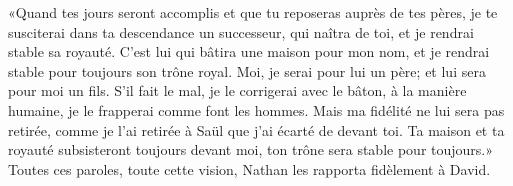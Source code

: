 «Quand tes jours seront accomplis et que tu reposeras auprès de tes pères,
	je te susciterai dans ta descendance un successeur, qui naîtra de toi,
	et je rendrai stable sa royauté.
C’est lui qui bâtira une maison pour mon nom,
	et je rendrai stable pour toujours son trône royal.
Moi, je serai pour lui un père; et lui sera pour moi un fils.
S’il fait le mal, je le corrigerai avec le bâton, à la manière humaine,
	je le frapperai comme font les hommes.
Mais ma fidélité ne lui sera pas retirée,
	comme je l’ai retirée à Saül que j’ai écarté de devant toi.
Ta maison et ta royauté subsisteront toujours devant moi,
	ton trône sera stable pour toujours.»
Toutes ces paroles, toute cette vision, Nathan les rapporta fidèlement à David.
